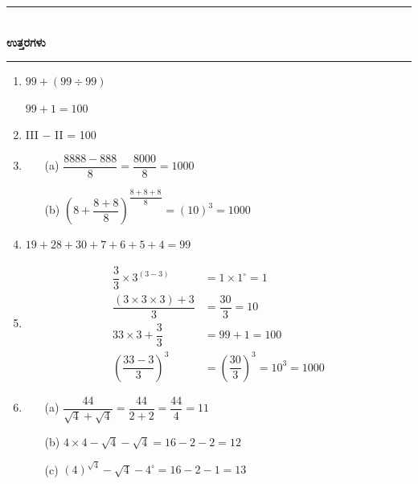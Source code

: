 \eject

\begin{center}
\rule{5cm}{1pt}\\[3pt]
{\Large\bfseries ಉತ್ತರಗಳು}\\[-0.1cm]
\rule{5cm}{1pt}
\end{center}

\begin{enumerate}
\itemsep=5pt

\item $99 + (99\div 99)$

$99 + 1 = 100$

\item III $-$ II = 100

\item 
\begin{itemize}
\item[(a)] $\dfrac{8888 - 888}{8} = \dfrac{8000}{8} = 1000$

\medskip

\item[(b)] $\left(8 + \dfrac{8+8}{8}\right)^{\dfrac{8+8+8}{8}} = (10)^{3} = 1000$
\end{itemize}

\item $19+28+30+7+6+5+4 = 99$

\smallskip

\item 
\begin{align*}
\dfrac{3}{3} \times 3^{(3-3)} & = 1\times 1^{\circ} = 1\\
\dfrac{(3\times 3\times 3) + 3}{3} & = \dfrac{30}{3} = 10\\
33\times 3 + \dfrac{3}{3} & = 99 + 1 = 100\\
\left(\dfrac{33-3}{3}\right)^{3} & = \left(\dfrac{30}{3}\right)^{3} = 10^{3} = 1000
\end{align*}

\item 
\begin{itemize}
\item[(a)] $\dfrac{44}{\sqrt{4} + \sqrt{4}} = \dfrac{44}{2+2} = \dfrac{44}{4} = 11$

\smallskip

\item[(b)] $4\times 4 - \sqrt{4} - \sqrt{4} = 16 - 2 - 2 = 12$

\smallskip

\item[(c)] $(4)^{\sqrt{4}} - \sqrt{4} - 4^{\circ} = 16 - 2 - 1 = 13$


\end{itemize}
\end{enumerate}
